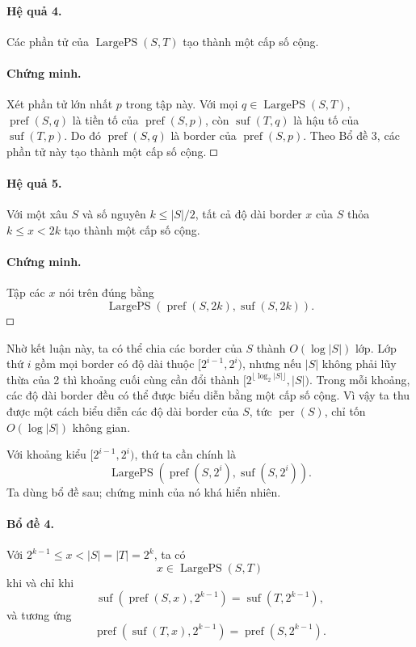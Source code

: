 \documentclass[11pt]{article}
\newcommand{\square}{\mathord{\vcenter{\hrule height .5pt
  \hbox{\vrule width .5pt height 5pt\kern5pt\vrule width .5pt}
  \hrule height .5pt}}}
\begin{document}
\paragraph{Hệ quả 4.}
Các phần tử của \(\operatorname{LargePS}(S,T)\) tạo thành một cấp số cộng.

\paragraph{Chứng minh.}
Xét phần tử lớn nhất \(p\) trong tập này. Với mọi
\(q\in\operatorname{LargePS}(S,T)\), \(\operatorname{pref}(S,q)\) là tiền tố
của \(\operatorname{pref}(S,p)\), còn \(\operatorname{suf}(T,q)\) là hậu tố của
\(\operatorname{suf}(T,p)\). Do đó \(\operatorname{pref}(S,q)\) là border của
\(\operatorname{pref}(S,p)\). Theo Bổ đề 3, các phần tử này tạo thành một cấp
số cộng. \(\square\)

\paragraph{Hệ quả 5.}
Với một xâu \(S\) và số nguyên \(k\le |S|/2\), tất cả độ dài border \(x\) của
\(S\) thỏa \(k\le x<2k\) tạo thành một cấp số cộng.

\paragraph{Chứng minh.}
Tập các \(x\) nói trên đúng bằng
\[
  \operatorname{LargePS}(\operatorname{pref}(S,2k),\operatorname{suf}(S,2k)).
\]
\(\square\)

Nhờ kết luận này, ta có thể chia các border của \(S\) thành \(O(\log |S|)\)
lớp. Lớp thứ \(i\) gồm mọi border có độ dài thuộc \([2^{i-1},2^i)\), nhưng nếu
\(|S|\) không phải lũy thừa của 2 thì khoảng cuối cùng cần đổi thành
\([2^{\lfloor\log_2|S|\rfloor},|S|)\). Trong mỗi khoảng, các độ dài border đều
có thể được biểu diễn bằng một cấp số cộng. Vì vậy ta thu được một cách biểu
diễn các độ dài border của \(S\), tức \(\operatorname{per}(S)\), chỉ tốn
\(O(\log |S|)\) không gian.

Với khoảng kiểu \([2^{i-1},2^i)\), thứ ta cần chính là
\[
  \operatorname{LargePS}(\operatorname{pref}(S,2^i),\operatorname{suf}(S,2^i)).
\]
Ta dùng bổ đề sau; chứng minh của nó khá hiển nhiên.

\paragraph{Bổ đề 4.}
Với \(2^{k-1}\le x<|S|=|T|=2^k\), ta có
\[
  x\in\operatorname{LargePS}(S,T)
\]
khi và chỉ khi
\[
  \operatorname{suf}(\operatorname{pref}(S,x),2^{k-1})
  =\operatorname{suf}(T,2^{k-1}),
\]
và tương ứng
\[
  \operatorname{pref}(\operatorname{suf}(T,x),2^{k-1})
  =\operatorname{pref}(S,2^{k-1}).
\]
\end{document}
